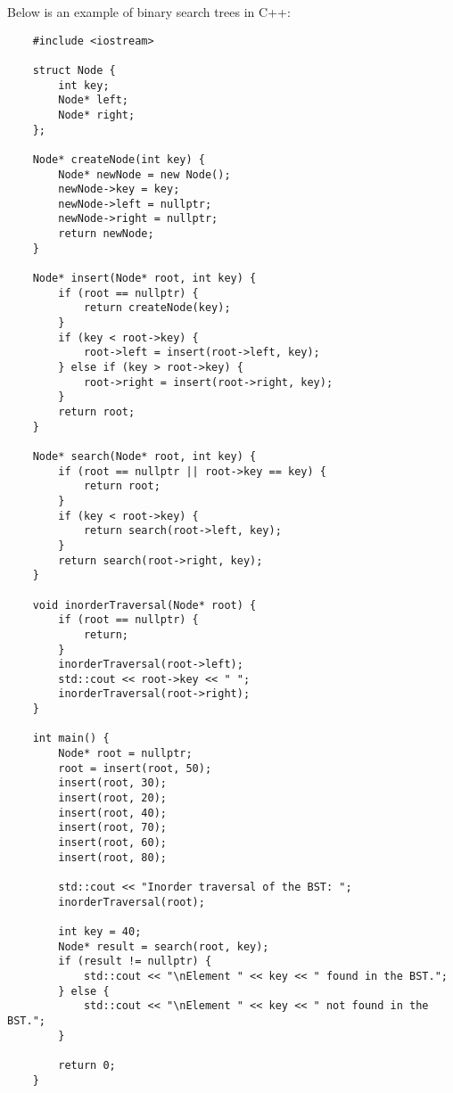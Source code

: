\begin{solution}
    Below is an example of binary search trees in C++:

    \horizontalline

    \begin{verbatim}
    #include <iostream>
    
    struct Node {
        int key;
        Node* left;
        Node* right;
    };
    
    Node* createNode(int key) {
        Node* newNode = new Node();
        newNode->key = key;
        newNode->left = nullptr;
        newNode->right = nullptr;
        return newNode;
    }
    
    Node* insert(Node* root, int key) {
        if (root == nullptr) {
            return createNode(key);
        }
        if (key < root->key) {
            root->left = insert(root->left, key);
        } else if (key > root->key) {
            root->right = insert(root->right, key);
        }
        return root;
    }
    
    Node* search(Node* root, int key) {
        if (root == nullptr || root->key == key) {
            return root;
        }
        if (key < root->key) {
            return search(root->left, key);
        }
        return search(root->right, key);
    }
    
    void inorderTraversal(Node* root) {
        if (root == nullptr) {
            return;
        }
        inorderTraversal(root->left);
        std::cout << root->key << " ";
        inorderTraversal(root->right);
    }
    
    int main() {
        Node* root = nullptr;
        root = insert(root, 50);
        insert(root, 30);
        insert(root, 20);
        insert(root, 40);
        insert(root, 70);
        insert(root, 60);
        insert(root, 80);
    
        std::cout << "Inorder traversal of the BST: ";
        inorderTraversal(root);
    
        int key = 40;
        Node* result = search(root, key);
        if (result != nullptr) {
            std::cout << "\nElement " << key << " found in the BST.";
        } else {
            std::cout << "\nElement " << key << " not found in the BST.";
        }
    
        return 0;
    }
    \end{verbatim}

    \horizontalline


\end{solution}

